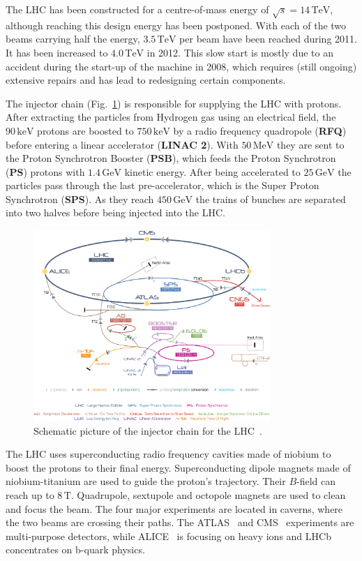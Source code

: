 The LHC has been constructed for a centre-of-mass energy of $\sqrt{s} = 14\,\text{TeV}$, although reaching this design energy has been postponed. With each of the two beams carrying half the energy, $3.5\,\text{TeV}$ per beam have been reached during 2011. It has been increased to $4.0\,\text{TeV}$ in 2012. This slow start is mostly due to an accident during the start-up of the machine in 2008, which requires (still ongoing) extensive repairs and has lead to redesigning certain components.

The injector chain (Fig.~\ref{fig:injchain}) is responsible for supplying the LHC with protons. After extracting the particles from Hydrogen gas using an electrical field, the $90\,\text{keV}$ protons are boosted to $750\,\text{keV}$ by a radio frequency quadropole (\textbf{RFQ}) before entering a linear accelerator (\textbf{LINAC 2}). With $50\,\text{MeV}$ they are sent to the Proton Synchrotron Booster (\textbf{PSB}), which feeds the Proton Synchrotron (\textbf{PS}) protons with $1.4\,\text{GeV}$ kinetic energy. After being accelerated to $25\,\text{GeV}$ the particles pass through the last pre-accelerator, which is the Super Proton Synchrotron (\textbf{SPS}). As they reach $450\,\text{GeV}$ the trains of bunches are separated into two halves before being injected into the LHC.

\begin{figure}[ht!]
  \centering
  \includegraphics[width=0.8\textwidth]{plots/lhcinjectorchain.jpg}
  \caption{Schematic picture of the injector chain for the LHC~\cite{injchain}.}
  \label{fig:injchain}
\end{figure}

The LHC uses superconducting radio frequency cavities made of niobium to boost the protons to their final energy. Superconducting dipole magnets made of niobium-titanium are used to guide the proton's trajectory. Their $B$-field can reach up to $8\,\text{T}$. Quadrupole, sextupole and octopole magnets are used to clean and focus the beam. The four major experiments are located in caverns, where the two beams are crossing their paths. The ATLAS~\cite{atlasjinst} and CMS~\cite{cmsjinst} experiments are multi-purpose detectors, while ALICE~\cite{alicejinst} is focusing on heavy ions and LHCb~\cite{lhcbjinst} concentrates on b-quark physics.



